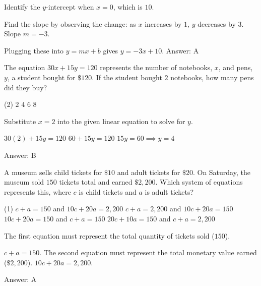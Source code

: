 \documentclass[11pt,paper=a4,answers]{exam}
\begin{document}
\begin{questions}
\begin{solution}
Identify the $y$-intercept when $x=0$, which is $10$.
\vspace{5pt}
\begin{center}
Find the slope by observing the change: as $x$ increases by $1$, $y$ decreases by $3$.
\vspace{5pt}
Slope $m = -3$.
\end{center}
\vspace{5pt}
Plugging these into $y = mx + b$ gives $y = -3x + 10$.
\vspace{5pt}
Answer: \colorbox{yellow!100}{A}
\end{solution}

\vspace{1cm}

\question
The equation $30x + 15y = 120$ represents the number of notebooks, $x$, and pens, $y$, a student bought for $\$120$. If the student bought $2$ notebooks, how many pens did they buy?
\begin{tasks}(2)
\task $2$
\task $4$
\task $6$
\task $8$
\end{tasks}

\begin{solution}
Substitute $x = 2$ into the given linear equation to solve for $y$.
\vspace{5pt}
\begin{center}
$30(2) + 15y = 120$
\vspace{5pt}
$60 + 15y = 120$
\vspace{5pt}
$15y = 60 \implies y = 4$
\end{center}
\vspace{5pt}
Answer: \colorbox{yellow!100}{B}
\end{solution}

\vspace{1cm}

\question
A museum sells child tickets for $\$10$ and adult tickets for $\$20$. On Saturday, the museum sold $150$ tickets total and earned $\$2,200$. Which system of equations represents this, where $c$ is child tickets and $a$ is adult tickets?
\begin{tasks}(1)
\task $c + a = 150$ and $10c + 20a = 2,200$
\task $c + a = 2,200$ and $10c + 20a = 150$
\task $10c + 20a = 150$ and $c + a = 150$
\task $20c + 10a = 150$ and $c + a = 2,200$
\end{tasks}

\begin{solution}
The first equation must represent the total quantity of tickets sold ($150$).
\vspace{5pt}
\begin{center}
$c + a = 150$.
\vspace{5pt}
The second equation must represent the total monetary value earned ($\$2,200$).
\vspace{5pt}
$10c + 20a = 2,200$.
\end{center}
\vspace{5pt}
Answer: \colorbox{yellow!100}{A}
\end{solution}


\end{questions}
\end{document}
